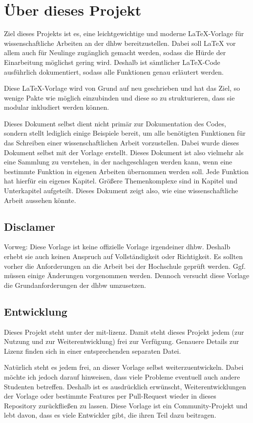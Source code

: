 
\chapter{Über dieses Projekt}
    
Ziel dieses Projekts ist es, eine leichtgewichtige und moderne 
\LaTeX{}-Vorlage für wissenschaftliche Arbeiten an der \Gls{dhbw}
bereitzustellen. Dabei soll \LaTeX{} vor allem auch für Neulinge zugänglich 
gemacht werden, sodass die Hürde der Einarbeitung möglichst gering wird. 
Deshalb ist sämtlicher \LaTeX{}-Code ausführlich dokumentiert, sodass alle 
Funktionen genau erläutert werden.

Diese \LaTeX{}-Vorlage wird von Grund auf neu geschrieben und hat das Ziel, 
so wenige Pakte wie möglich einzubinden und diese so zu strukturieren, dass 
sie modular inkludiert werden können.

Dieses Dokument selbst dient nicht primär zur Dokumentation des Codes, 
sondern stellt lediglich einige Beispiele bereit, um alle benötigten 
Funktionen für das Schreiben einer wissenschaftlichen Arbeit vorzustellen.
Dabei wurde dieses Dokument selbst mit der Vorlage erstellt.
Dieses Dokument ist also vielmehr als eine Sammlung zu verstehen, in der
nachgeschlagen werden kann, wenn eine bestimmte Funktion in eigenen
Arbeiten übernommen werden soll. Jede Funktion hat hierfür ein eigenes 
Kapitel. Größere Themenkomplexe sind in Kapitel und Unterkapitel 
aufgeteilt. Dieses Dokument zeigt also, wie eine wissenschaftliche Arbeit
aussehen könnte.

\section{Disclamer}

Vorweg: Diese Vorlage ist keine offizielle Vorlage irgendeiner \Gls{dhbw}.
Deshalb erhebt sie auch keinen Anspruch auf Vollständigkeit oder
Richtigkeit. Es sollten vorher die Anforderungen an die Arbeit bei der
Hochschule geprüft werden. Ggf. müssen einige Änderungen vorgenommen werden.
Dennoch versucht diese Vorlage die Grundanforderungen der \Gls{dhbw}
umzusetzen.

\section{Entwicklung}

Dieses Projekt steht unter der \Gls{mit-lizenz}. Damit steht dieses Projekt
jedem (zur Nutzung und zur Weiterentwicklung) frei zur Verfügung. Genauere
Details zur Lizenz finden sich in einer entsprechenden separaten Datei.

Natürlich steht es jedem frei, an dieser Vorlage selbst weiterzuentwickeln.
Dabei möchte ich jedoch darauf hinweisen, dass viele Probleme eventuell auch
andere Studenten betreffen. Deshalb ist es ausdrücklich erwünscht,
Weiterentwicklungen der Vorlage oder bestimmte Features per Pull-Request
wieder in dieses Repository zurückfließen zu lassen. Diese Vorlage ist ein
Community-Projekt und lebt davon, dass es viele Entwickler gibt, die ihren
Teil dazu beitragen.